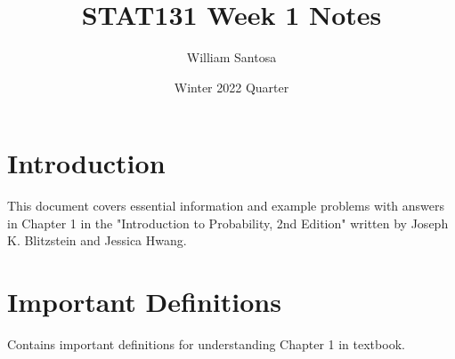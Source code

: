 \documentclass[12pt, letterpaper]{article}
\title{STAT131 Week 1 Notes}
\author{William Santosa}
\date{Winter 2022 Quarter}
\begin{document}
\maketitle

\section{Introduction}
This document covers essential information and example problems with answers in Chapter 1 in the "Introduction to Probability, 2nd Edition" written by Joseph K. Blitzstein and Jessica Hwang.

\section{Important Definitions}

Contains important definitions for understanding Chapter 1 in textbook.
\end{document}
